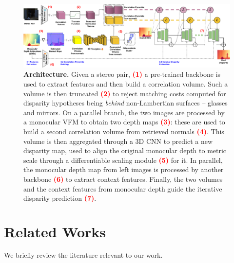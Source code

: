 \begin{figure}[t]
    \centering
    \includegraphics[width=0.98\linewidth]{imgs/final_arch_blin_con_numerini.pdf}\vspace{-0.2cm}
    \caption{\textbf{\method Architecture.} Given a stereo pair, \textcolor{red}{\bf(1)} a pre-trained backbone is used to extract features and then build a correlation volume. Such a volume is then truncated \textcolor{red}{\bf(2)} to reject matching costs computed for disparity hypotheses being \textit{behind} non-Lambertian surfaces -- glasses and mirrors. On a parallel branch, the two images are processed by a monocular VFM to obtain two depth maps \textcolor{red}{\bf(3)}: these are used to build a second correlation volume from retrieved normals \textcolor{red}{\bf(4)}. This volume is then aggregated through a 3D CNN to predict a new disparity map, used to align the original monocular depth to metric scale through a differentiable scaling module \textcolor{red}{\bf(5)} for it. In parallel, the monocular depth map from left images is processed by another backbone \textcolor{red}{\bf(6)} to extract context features.
    Finally, the two volumes and the context features from monocular depth guide the iterative disparity prediction \textcolor{red}{\bf(7)}.}
    \label{fig:arch}
\end{figure}

\section{Related Works}
\label{sec:related}

We briefly review the literature relevant to our work.

